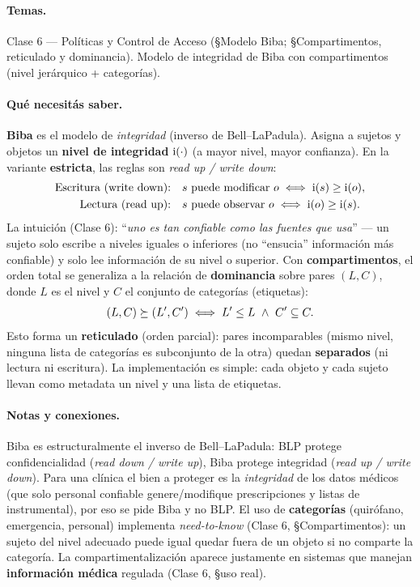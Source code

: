 \paragraph{Temas.}
Clase 6 — Políticas y Control de Acceso (\S Modelo Biba; \S Compartimentos, reticulado y
dominancia). Modelo de integridad de Biba con compartimentos (nivel jerárquico + categorías).

\paragraph{Qué necesitás saber.}
\textbf{Biba} es el modelo de \emph{integridad} (inverso de Bell--LaPadula). Asigna a sujetos y
objetos un \textbf{nivel de integridad} $\mathrm{i}(\cdot)$ (a mayor nivel, mayor confianza). En la
variante \textbf{estricta}, las reglas son \emph{read up / write down}:
\begin{align*}
\text{Escritura (write down):}\quad & s \text{ puede modificar } o \iff \mathrm{i}(s) \ge \mathrm{i}(o),\\
\text{Lectura (read up):}\quad & s \text{ puede observar } o \iff \mathrm{i}(o) \ge \mathrm{i}(s).
\end{align*}
La intuición (Clase 6): ``\emph{uno es tan confiable como las fuentes que usa}'' --- un sujeto
solo escribe a niveles iguales o inferiores (no ``ensucia'' información más confiable) y solo lee
información de su nivel o superior. Con \textbf{compartimentos}, el orden total se generaliza a
la relación de \textbf{dominancia} sobre pares $(L,C)$, donde $L$ es el nivel y $C$ el conjunto
de categorías (etiquetas):
\begin{equation*}
(L,C) \succeq (L',C') \iff L' \le L \ \wedge\ C' \subseteq C .
\end{equation*}
Esto forma un \textbf{reticulado} (orden parcial): pares incomparables (mismo nivel, ninguna
lista de categorías es subconjunto de la otra) quedan \textbf{separados} (ni lectura ni
escritura). La implementación es simple: cada objeto y cada sujeto llevan como metadata un nivel
y una lista de etiquetas.

\paragraph{Notas y conexiones.}
Biba es estructuralmente el inverso de Bell--LaPadula: BLP protege confidencialidad
(\emph{read down / write up}), Biba protege integridad (\emph{read up / write down}). Para una
clínica el bien a proteger es la \emph{integridad} de los datos médicos (que solo personal
confiable genere/modifique prescripciones y listas de instrumental), por eso se pide Biba y no
BLP. El uso de \textbf{categorías} (quirófano, emergencia, personal) implementa
\emph{need-to-know} (Clase 6, \S Compartimentos): un sujeto del nivel adecuado puede igual quedar
fuera de un objeto si no comparte la categoría. La compartimentalización aparece justamente en
sistemas que manejan \textbf{información médica} regulada (Clase 6, \S uso real).

